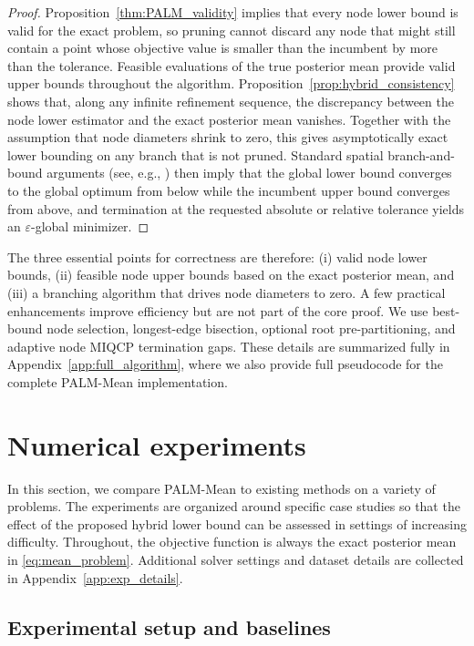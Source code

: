 \documentclass[pdflatex,sn-mathphys-num]{sn-jnl}%
\theoremstyle{thmstyleone}%
\theoremstyle{thmstyletwo}%
\theoremstyle{thmstylethree}%
\begin{document}
\begin{proof}
Proposition~\ref{thm:PALM_validity} implies that every node lower bound is valid for the exact problem, so pruning cannot discard any node that might still contain a point whose objective value is smaller than the incumbent by more than the tolerance. Feasible evaluations of the true posterior mean provide valid upper bounds throughout the algorithm. Proposition~\ref{prop:hybrid_consistency} shows that, along any infinite refinement sequence, the discrepancy between the node lower estimator and the exact posterior mean vanishes. Together with the assumption that node diameters shrink to zero, this gives asymptotically exact lower bounding on any branch that is not pruned. Standard spatial branch-and-bound arguments (see, e.g., \cite{ref:reduced_space_bb}) then imply that the global lower bound converges to the global optimum from below while the incumbent upper bound converges from above, and termination at the requested absolute or relative tolerance yields an $\varepsilon$-global minimizer.
\end{proof}

The three essential points for correctness are therefore: (i) valid node lower bounds, (ii) feasible node upper bounds based on the exact posterior mean, and (iii) a branching algorithm that drives node diameters to zero. A few practical enhancements improve efficiency but are not part of the core proof. We use best-bound node selection, longest-edge bisection, optional root pre-partitioning, and adaptive node MIQCP termination gaps. These details are summarized fully in Appendix~\ref{app:full_algorithm}, where we also provide full pseudocode for the complete PALM-Mean implementation.

\section{Numerical experiments}
\label{sec:numerical-experiments}

In this section, we compare PALM-Mean to existing methods on a variety of problems. The experiments are organized around specific case studies so that the effect of the proposed hybrid lower bound can be assessed in settings of increasing difficulty. Throughout, the objective function is always the exact posterior mean in \eqref{eq:mean_problem}. Additional solver settings and dataset details are collected in Appendix~\ref{app:exp_details}.

\subsection{Experimental setup and baselines}
\end{document}
